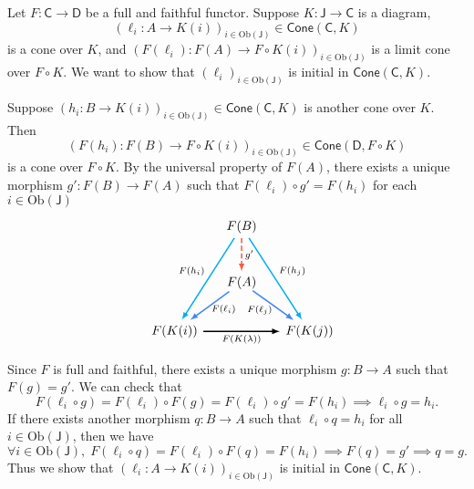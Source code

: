 \begin{prf}
    Let $F: \mathsf{C} \rightarrow \mathsf{D}$ be a full and faithful functor. Suppose $K: \mathsf{J} \rightarrow \mathsf{C}$ is a diagram, 
    $$
    \left(\ell_i: A \rightarrow K(i)\right)_{i\in \mathrm{Ob}(\mathsf{J})}\in \mathsf{Cone}\left(\mathsf{C},K\right)
    $$ 
    is a cone over $K$, and $\left(F(\ell_i): F(A) \rightarrow F\circ K(i)\right)_{i\in \mathrm{Ob}(\mathsf{J})}$ is a limit cone over $F\circ K$. We want to show that $\left(\ell_i\right)_{i\in \mathrm{Ob}(\mathsf{J})}$ is initial in $\mathsf{Cone}\left(\mathsf{C},K\right)$.
    
    
    Suppose $\left(h_i:B \rightarrow K(i)\right)_{i\in \mathrm{Ob}(\mathsf{J})}\in \mathsf{Cone}\left(\mathsf{C},K\right)$ is another cone over $K$. Then 
    \[
    \left( F(h_i): F(B)\longrightarrow F\circ K(i)\right)_{i\in \mathrm{Ob}(\mathsf{J})}\in \mathsf{Cone}\left(\mathsf{D},F\circ K\right)
    \]
    is a cone over $F\circ K$. By the universal property of $F(A)$, there exists a unique morphism $g':F(B)\to F(A)$ such that $F(\ell_i) \circ g' = F(h_i)$ for each $i\in \mathrm{Ob}(\mathsf{J})$
    \[
        \begin{tikzcd}[ampersand replacement=\&, every arrow/.append style={-latex, line width=1.1pt}]
            \&   [-1.5em]                \&[-1em] F(B) \arrow[rdd, draw=cyan, "F(h_j)"] \arrow[ldd, draw=cyan, "F(h_i)"'] \arrow[d, dash pattern=on 4pt off 2pt, draw=arrowRed, "g'"] \& [-1em]                  \\[+0.3cm]
            \&                   \& F(A)\arrow[ld, draw=arrowBlue, shorten <=-3pt, "F(\ell_i)" yshift=4.5pt] \arrow[rd, draw=arrowBlue, shorten <=-4.5pt, "F(\ell_j)"' yshift=4pt]               \&                   \\[0.1cm]
        \& F(K(i)) \arrow[rr, "F(K(\lambda))"']\&   \& F(K(j))
        \end{tikzcd}
    \]
    
    Since $F$ is full and faithful, there exists a unique morphism $g:B\to A$ such that $F(g)=g'$. We can check that  
    \[
        F\left(\ell_i \circ g\right)=F\left(\ell_i \right)\circ F\left( g\right)=F\left(\ell_i \right)\circ g'=F\left(h_i\right)\implies \ell_i \circ g=h_i.
    \]
    If there exists another morphism $q:B\to A$ such that $\ell_i \circ q=h_i$ for all $i\in\mathrm{Ob}\left(\mathsf{J}\right)$, then we have
    \[
    \forall i \in\mathrm{Ob}\left(\mathsf{J}\right),\;F\left( \ell_i \circ q\right)=F\left(\ell_i \right)\circ F\left( q\right)=F\left(h_i\right)\implies F\left( q\right)=g'\implies q=g.
    \]
    Thus we show that $\left(\ell_i:A\to K(i)\right)_{i\in \mathrm{Ob}(\mathsf{J})}$ is initial in $\mathsf{Cone}\left(\mathsf{C},K\right)$.
\end{prf}


